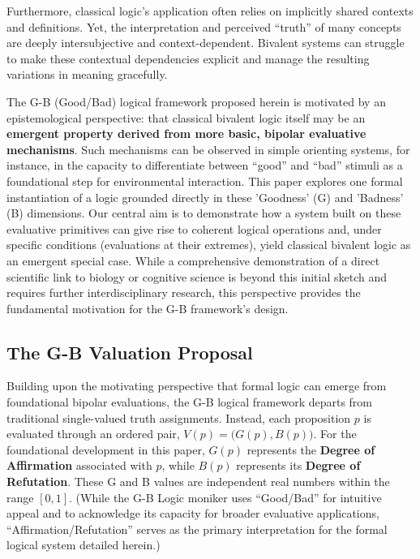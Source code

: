 \documentclass[11pt]{article}
\newcommand{\GB}[2]{\bigl(#1,#2\bigr)} %
\theoremstyle{remark}
\begin{document}
Furthermore, classical logic's application often relies on implicitly shared contexts and definitions. Yet, the interpretation and perceived ``truth'' of many concepts are deeply intersubjective and context-dependent. Bivalent systems can struggle to make these contextual dependencies explicit and manage the resulting variations in meaning gracefully.

The G-B (Good/Bad) logical framework proposed herein is motivated by an epistemological perspective: that classical bivalent logic itself may be an \textbf{emergent property derived from more basic, bipolar evaluative mechanisms}. Such mechanisms can be observed in simple orienting systems, for instance, in the capacity to differentiate between ``good'' and ``bad'' stimuli as a foundational step for environmental interaction. This paper explores one formal instantiation of a logic grounded directly in these 'Goodness' (G) and 'Badness' (B) dimensions. Our central aim is to demonstrate how a system built on these evaluative primitives can give rise to coherent logical operations and, under specific conditions (evaluations at their extremes), yield classical bivalent logic as an emergent special case. While a comprehensive demonstration of a direct scientific link to biology or cognitive science is beyond this initial sketch and requires further interdisciplinary research, this perspective provides the fundamental motivation for the G-B framework's design.

\subsection{The G-B Valuation Proposal}
Building upon the motivating perspective that formal logic can emerge from foundational bipolar evaluations, the G-B logical framework departs from traditional single-valued truth assignments. Instead, each proposition $p$ is evaluated through an ordered pair, $V(p) = \GB{G(p)}{B(p)}$. For the foundational development in this paper, $G(p)$ represents the \textbf{Degree of Affirmation} associated with $p$, while $B(p)$ represents its \textbf{Degree of Refutation}. These G and B values are independent real numbers within the range $[0,1]$. (While the G-B Logic moniker uses ``Good/Bad'' for intuitive appeal and to acknowledge its capacity for broader evaluative applications, ``Affirmation/Refutation'' serves as the primary interpretation for the formal logical system detailed herein.)
\end{document}
